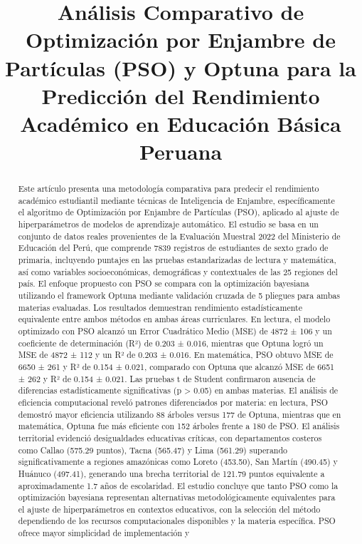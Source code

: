 \documentclass[conference]{IEEEtran}
\begin{document}
\title{Análisis Comparativo de Optimización por Enjambre de Partículas (PSO) y Optuna para la Predicción del Rendimiento Académico en Educación Básica Peruana}

\author{
}

\maketitle

\begin{abstract}
Este artículo presenta una metodología comparativa para predecir el rendimiento académico estudiantil mediante técnicas de Inteligencia de Enjambre, específicamente el algoritmo de Optimización por Enjambre de Partículas (PSO), aplicado al ajuste de hiperparámetros de modelos de aprendizaje automático. El estudio se basa en un conjunto de datos reales provenientes de la Evaluación Muestral 2022 del Ministerio de Educación del Perú, que comprende 7839 registros de estudiantes de sexto grado de primaria, incluyendo puntajes en las pruebas estandarizadas de lectura y matemática, así como variables socioeconómicas, demográficas y contextuales de las 25 regiones del país. El enfoque propuesto con PSO se compara con la optimización bayesiana utilizando el framework Optuna mediante validación cruzada de 5 pliegues para ambas materias evaluadas. Los resultados demuestran rendimiento estadísticamente equivalente entre ambos métodos en ambas áreas curriculares. En lectura, el modelo optimizado con PSO alcanzó un Error Cuadrático Medio (MSE) de 4872 ± 106 y un coeficiente de determinación (R²) de 0.203 ± 0.016, mientras que Optuna logró un MSE de 4872 ± 112 y un R² de 0.203 ± 0.016. En matemática, PSO obtuvo MSE de 6650 ± 261 y R² de 0.154 ± 0.021, comparado con Optuna que alcanzó MSE de 6651 ± 262 y R² de 0.154 ± 0.021. Las pruebas t de Student confirmaron ausencia de diferencias estadísticamente significativas (p > 0.05) en ambas materias. El análisis de eficiencia computacional reveló patrones diferenciados por materia: en lectura, PSO demostró mayor eficiencia utilizando 88 árboles versus 177 de Optuna, mientras que en matemática, Optuna fue más eficiente con 152 árboles frente a 180 de PSO. El análisis territorial evidenció desigualdades educativas críticas, con departamentos costeros como Callao (575.29 puntos), Tacna (565.47) y Lima (561.29) superando significativamente a regiones amazónicas como Loreto (453.50), San Martín (490.45) y Huánuco (497.41), generando una brecha territorial de 121.79 puntos equivalente a aproximadamente 1.7 años de escolaridad. El estudio concluye que tanto PSO como la optimización bayesiana representan alternativas metodológicamente equivalentes para el ajuste de hiperparámetros en contextos educativos, con la selección del método dependiendo de los recursos computacionales disponibles y la materia específica. PSO ofrece mayor simplicidad de implementación y 
\end{abstract}
\end{document}
